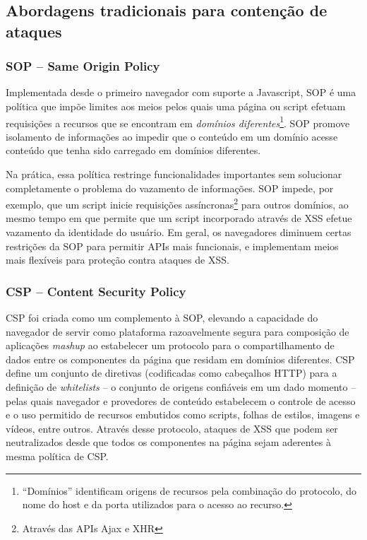 \subsection{Abordagens tradicionais para contenção de ataques}

\subsubsection{SOP -- Same Origin Policy}
Implementada desde o primeiro navegador com suporte a Javascript, SOP \cite{W3C:SOP} é uma política que impõe limites aos meios pelos quais uma página ou script efetuam requisições a recursos que se encontram em \textit{domínios diferentes}\footnote{``Domínios'' identificam origens de recursos pela combinação do protocolo, do nome do host e da porta utilizados para o acesso ao recurso.}. SOP promove isolamento de informações ao impedir que o conteúdo em um domínio acesse conteúdo que tenha sido carregado em domínios diferentes.

Na prática, essa política restringe funcionalidades importantes sem solucionar completamente o problema do vazamento de informações. SOP impede, por exemplo, que um script inicie requisições assíncronas\footnote{Através das	APIs Ajax e XHR} para outros domínios, ao mesmo tempo em que permite que um script incorporado através de XSS efetue vazamento da identidade do usuário. Em geral, os navegadores diminuem certas restrições da SOP para permitir APIs mais funcionais, e implementam meios mais flexíveis para proteção contra ataques de XSS.

\subsubsection{CSP -- Content Security Policy}
CSP foi criada como um complemento à SOP, elevando a capacidade do navegador de servir como plataforma razoavelmente segura para composição de aplicações \textit{mashup} ao estabelecer um protocolo para o compartilhamento de dados entre os componentes da página que residam em domínios diferentes. CSP define um conjunto de diretivas (codificadas como cabeçalhos HTTP) para a definição de \textit{whitelists} -- o conjunto de origens confiáveis em um dado momento -- pelas quais navegador e provedores de conteúdo estabelecem o controle de acesso e o uso permitido de recursos embutidos como scripts, folhas de estilos, imagens e vídeos, entre outros. Através desse protocolo, ataques de XSS que podem ser neutralizados desde que todos os componentes na página sejam aderentes à mesma política de CSP.

